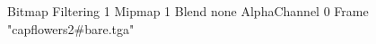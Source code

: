 {Bitmap
	{Filtering 1}
	{Mipmap 1}
	{Blend none}
	{AlphaChannel 0}
	{Frame "capflowers2#bare.tga"}
}
